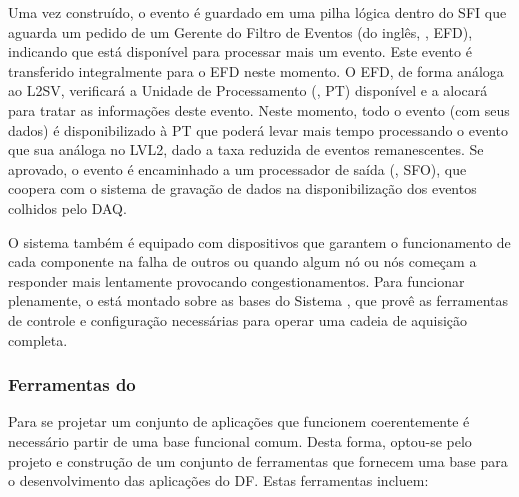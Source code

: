 Uma vez construído, o evento é guardado em uma pilha lógica dentro do SFI que
aguarda um pedido de um Gerente do Filtro de Eventos (do inglês, , EFD), indicando que está disponível para processar
mais um evento. Este evento é transferido integralmente para o EFD neste
momento. O EFD, de forma análoga ao L2SV, verificará a Unidade de
Processamento (, PT) disponível e a alocará para tratar
as informações deste evento. Neste momento, todo o evento (com seus dados) é
disponibilizado à PT que poderá levar mais tempo processando o evento que sua
análoga no LVL2, dado a taxa reduzida de eventos remanescentes. Se aprovado, o
evento é encaminhado a um processador de saída (, SFO),
que coopera com o sistema de gravação de dados na disponibilização dos eventos
colhidos pelo DAQ.

O sistema também é equipado com dispositivos que garantem o funcionamento de
cada componente na falha de outros ou quando algum nó ou nós começam a
responder mais lentamente provocando congestionamentos. Para funcionar
plenamente, o  está montado sobre as bases do Sistema
, que provê as ferramentas de controle e configuração necessárias
para operar uma cadeia de aquisição completa.

\subsubsection{Ferramentas do }
\label{sec:dftools}

Para se projetar um conjunto de aplicações que funcionem coerentemente é
necessário partir de uma base funcional comum. Desta forma, optou-se pelo
projeto e construção de um conjunto de ferramentas que fornecem uma base para
o desenvolvimento das aplicações do DF. Estas ferramentas incluem:

